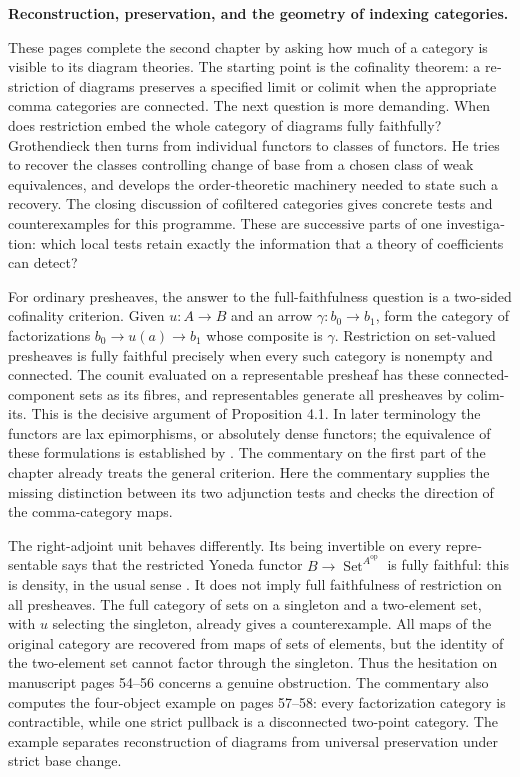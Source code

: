 \begin{otherlanguage}{english}
\begingroup
{}
\noindent\textbf{Reconstruction, preservation, and the geometry of indexing categories.}

These pages complete the second chapter by asking how much of a category is
visible to its diagram theories. The starting point is the cofinality theorem:
a restriction of diagrams preserves a specified limit or colimit when the
appropriate comma categories are connected. The next question is more demanding.
When does restriction embed the whole category of diagrams fully faithfully?
Grothendieck then turns from individual functors to classes of functors. He
tries to recover the classes controlling change of base from a chosen class
of weak equivalences, and develops the order-theoretic machinery needed to
state such a recovery. The closing discussion of cofiltered categories gives
concrete tests and counterexamples for this programme. These are successive
parts of one investigation: which local tests retain exactly the information
that a theory of coefficients can detect?

For ordinary presheaves, the answer to the full-faithfulness question is a
two-sided cofinality criterion. Given $u:A\to B$ and an arrow
$\gamma:b_0\to b_1$, form the category of factorizations
$b_0\to u(a)\to b_1$ whose composite is $\gamma$. Restriction on
set-valued presheaves is fully faithful precisely when every such category
is nonempty and connected. The counit evaluated on a representable presheaf
has these connected-component sets as its fibres, and representables generate
all presheaves by colimits. This is the decisive argument of Proposition 4.1.
In later terminology the functors are lax epimorphisms, or absolutely dense
functors; the equivalence of these formulations is established by
\citet{AdamekElBashirSobralVelebil2001}. The commentary on the first part of the
chapter already treats the general criterion. Here the commentary supplies the
missing distinction between its two adjunction tests and checks the direction
of the comma-category maps.

The right-adjoint unit behaves differently. Its being invertible on every
representable says that the restricted Yoneda functor
$B\to\operatorname{Set}^{A^{\mathrm{op}}}$ is fully faithful: this is
density, in the usual sense \citep[Definition 6.5.11]{Riehl2016}. It does not
imply full faithfulness of restriction on all presheaves. The full category
of sets on a singleton and a two-element set, with $u$ selecting the
singleton, already gives a counterexample. All maps of the original category
are recovered from maps of sets of elements, but the identity of the
two-element set cannot factor through the singleton. Thus the hesitation on
manuscript pages 54--56 concerns a genuine obstruction. The commentary also
computes the four-object example on pages 57--58: every factorization
category is contractible, while one strict pullback is a disconnected
two-point category. The example separates reconstruction of diagrams from
universal preservation under strict base change.


\end{otherlanguage}
